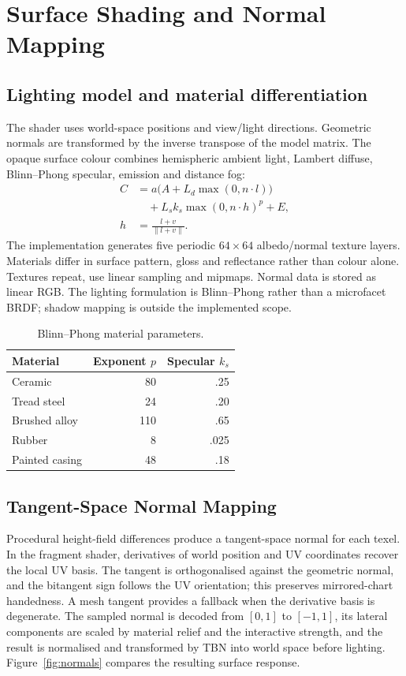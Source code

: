 \documentclass[10pt,a4paper,twocolumn]{article}
\begin{document}
\section{Surface Shading and Normal Mapping}\label{sec:normal}
\subsection{Lighting model and material differentiation}
The shader uses world-space positions and view/light directions. Geometric normals are transformed by the inverse transpose of the model matrix. The opaque surface colour combines hemispheric ambient light, Lambert diffuse, Blinn--Phong specular, emission and distance fog:
\begin{equation}
\begin{aligned}
C &= a\bigl(A + L_d\max(0,n\!\cdot\!l)\bigr)\\
  &\quad + L_s k_s\max(0,n\!\cdot\!h)^p + E,\\
h &= \frac{l+v}{\|l+v\|}.
\end{aligned}
\label{eq:lighting}
\end{equation}
The implementation generates five periodic $64\times64$ albedo/normal texture layers. Materials differ in surface pattern, gloss and reflectance rather than colour alone. Textures repeat, use linear sampling and mipmaps. Normal data is stored as linear RGB. The lighting formulation is Blinn--Phong rather than a microfacet BRDF; shadow mapping is outside the implemented scope.

\begin{table}[t]
\centering
\caption{Blinn--Phong material parameters.}\label{tab:materials}
\small
\begin{tabular}{@{}lrr@{}}\toprule
Material & Exponent $p$ & Specular $k_s$\\\midrule
Ceramic & 80 & .25\\
Tread steel & 24 & .20\\
Brushed alloy & 110 & .65\\
Rubber & 8 & .025\\
Painted casing & 48 & .18\\\bottomrule
\end{tabular}
\end{table}

\subsection{Tangent-Space Normal Mapping}
Procedural height-field differences produce a tangent-space normal for each texel. In the fragment shader, derivatives of world position and UV coordinates recover the local UV basis. The tangent is orthogonalised against the geometric normal, and the bitangent sign follows the UV orientation; this preserves mirrored-chart handedness. A mesh tangent provides a fallback when the derivative basis is degenerate. The sampled normal is decoded from $[0,1]$ to $[-1,1]$, its lateral components are scaled by material relief and the interactive strength, and the result is normalised and transformed by TBN into world space before lighting. Figure~\ref{fig:normals} compares the resulting surface response.
\end{document}
